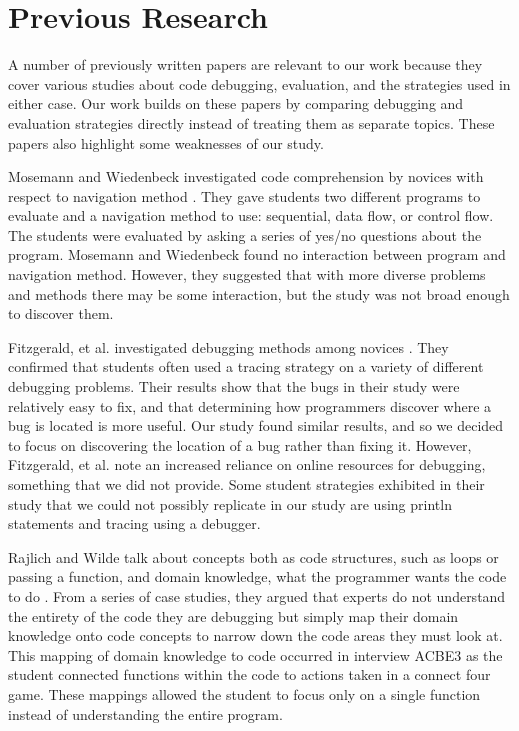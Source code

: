 \section{Previous Research}

A number of previously written papers are relevant to our work because they cover various studies about code debugging, evaluation, and the strategies used in either case. Our work builds on these papers by comparing debugging and evaluation strategies directly instead of treating them as separate topics. These papers also highlight some weaknesses of our study. 

Mosemann and Wiedenbeck investigated code comprehension by novices with respect to navigation method \cite{mosemann2001}.
They gave students two different programs to evaluate and a navigation method to use: sequential, data flow, or control flow.
The students were evaluated by asking a series of yes/no questions about the program.
Mosemann and Wiedenbeck found no interaction between program and navigation method.
However, they suggested that with more diverse problems and methods there may be some interaction, but the study was not broad enough to discover them.

Fitzgerald, et al. investigated debugging methods among novices \cite{fitzgerald2008}.
They confirmed that students often used a tracing strategy on a variety of different debugging problems.
Their results show that the bugs in their study were relatively easy to fix, and that determining how programmers discover where a bug is located is more useful.
Our study found similar results, and so we decided to focus on discovering the location of a bug rather than fixing it.
However, Fitzgerald, et al. note an increased reliance on online resources for debugging, something that we did not provide.
Some student strategies exhibited in their study that we could not possibly replicate in our study are using println statements and tracing using a debugger.

Rajlich and Wilde talk about concepts both as code structures, such as loops or passing a function, and domain knowledge, what the programmer wants the code to do \cite{1021348}.
From a series of case studies, they argued that experts do not understand the entirety of the code they are debugging but simply map their domain knowledge onto code concepts to narrow down the code areas they must look at.
This mapping of domain knowledge to code occurred in interview ACBE3 as the student connected functions within the code to actions taken in a connect four game.
These mappings allowed the student to focus only on a single function instead of understanding the entire program.

